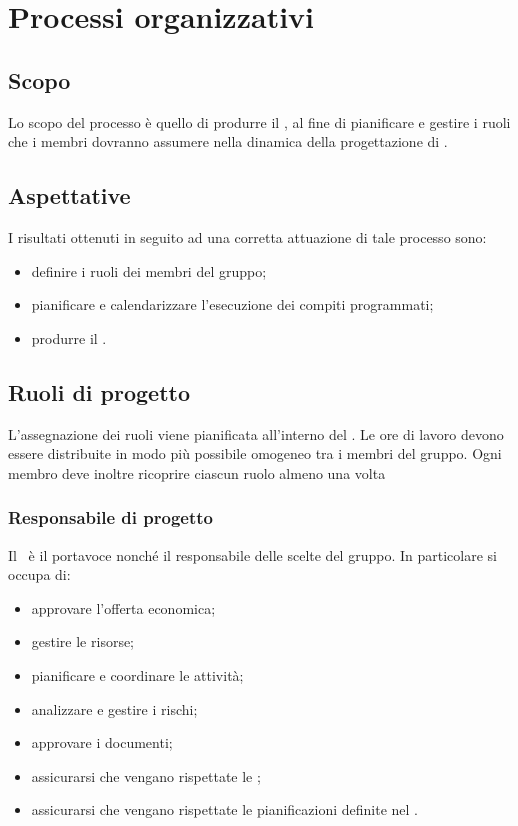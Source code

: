\documentclass[../NormeDiProgetto.tex]{subfiles}
\begin{document}
	\section{Processi organizzativi}
		\subsection{Scopo}
			Lo scopo del processo è quello di produrre il \pianodiprogettoRR, al fine di pianificare e gestire i ruoli che i membri dovranno assumere nella dinamica della progettazione di \progetto.
		\subsection{Aspettative}
			I risultati ottenuti in seguito ad una corretta attuazione di tale processo sono:
			\begin{itemize}
				\item definire i ruoli dei membri del gruppo;
				\item pianificare e calendarizzare l'esecuzione dei compiti programmati;
				\item produrre il \pianodiprogetto.
			\end{itemize}				
		\subsection{Ruoli di progetto}
			L'assegnazione dei ruoli viene pianificata all'interno del \pianodiprogetto. Le ore di lavoro devono essere distribuite in modo più possibile omogeneo tra i membri del gruppo. Ogni membro deve inoltre ricoprire ciascun ruolo almeno una volta
			\subsubsection{Responsabile di progetto}
				Il \responsabilediprogetto\ è il portavoce nonché il responsabile delle scelte del gruppo.
				In particolare si occupa di:
				\begin{itemize}
					\item approvare l'offerta economica;
					\item gestire le risorse;
					\item pianificare e coordinare le attività;
					\item analizzare e gestire i rischi;	
					\item approvare i documenti;
					\item assicurarsi che vengano rispettate le \normediprogetto;
					\item assicurarsi che vengano rispettate le pianificazioni definite nel \pianodiprogetto .
				\end{itemize}
\end{document}
